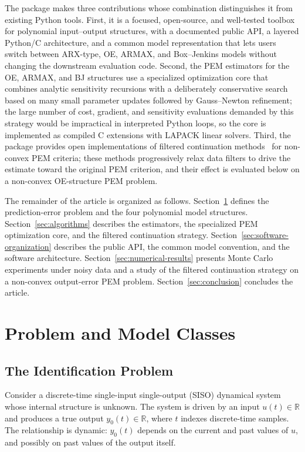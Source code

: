 \documentclass[acmsmall,screen,review]{acmart}
\begin{document}
The package makes three contributions whose combination distinguishes
it from existing Python tools.
First, it is a focused, open-source, and well-tested toolbox for polynomial
input--output structures, with a documented public API, a layered Python/C
architecture, and a common model representation that lets users switch
between ARX-type, OE, ARMAX, and Box--Jenkins models without changing the
downstream evaluation code.
Second, the PEM estimators for the OE, ARMAX, and BJ structures use a
specialized optimization core that combines analytic sensitivity recursions
with a deliberately conservative search based on many small parameter
updates followed by Gauss--Newton refinement; the large number of cost,
gradient, and sensitivity evaluations demanded by this strategy would be
impractical in interpreted Python loops, so the core is implemented as
compiled C extensions with LAPACK linear solvers.
Third, the package provides open implementations of filtered continuation
methods~\cite{eckhard2013input,eckhard2017cost} for non-convex PEM criteria;
these methods progressively relax data filters to drive the estimate toward
the original PEM criterion, and their effect is evaluated below on a
non-convex OE-structure PEM problem.

The remainder of the article is organized as follows.
Section~\ref{sec:problem-model-classes} defines the prediction-error
problem and the four polynomial model structures.
Section~\ref{sec:algorithms} describes the estimators, the specialized PEM
optimization core, and the filtered
continuation strategy.
Section~\ref{sec:software-organization} describes the public API, the common
model convention, and the software architecture.
Section~\ref{sec:numerical-results} presents Monte Carlo experiments
under noisy data and a study of the filtered continuation strategy
on a non-convex output-error PEM problem.
Section~\ref{sec:conclusion} concludes the article.

\section{Problem and Model Classes}
\label{sec:problem-model-classes}

\subsection{The Identification Problem}
\label{subsec:identification-problem}

Consider a discrete-time single-input single-output (SISO) dynamical system
whose internal structure is unknown.  The system is driven by an input
$u(t) \in \mathbb{R}$ and produces a true output $y_0(t) \in \mathbb{R}$,
where $t$ indexes discrete-time samples.  The relationship is dynamic:
$y_0(t)$ depends on the current and past values of $u$, and possibly on past
values of the output itself.
\end{document}
